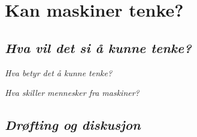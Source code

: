 \section{Kan maskiner tenke?}

\autocite{Kiran2013}

\subsection{\textit{Hva vil det si å kunne tenke?}}

\textit{Hva betyr det å kunne tenke?} 

\textit{Hva skiller mennesker fra maskiner?}

\subsection{\textit{Drøfting og diskusjon}}